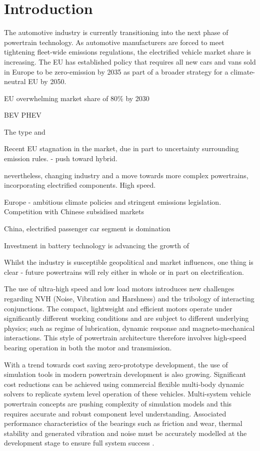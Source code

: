 \chapter{Introduction} \label{Introduction}

The automotive industry is currently transitioning into the next phase of powertrain technology. As automotive manufacturers are forced to meet tightening fleet-wide emissions regulations, the electrified vehicle market share is increasing. The EU has established policy \cite{EUL110/5} that requires all new cars and vans sold in Europe to be zero-emission by 2035 as part of a broader strategy for a climate-neutral EU by 2050.

EU overwhelming market share of 80\% by 2030 

BEV PHEV 

The type and 

Recent EU stagnation in the market, due in part to uncertainty surrounding emission rules. - push toward hybrid.

nevertheless, changing industry and a move towards more complex powertrains, incorporating electrified components. High speed. 

Europe - ambitious climate policies and stringent emissions legislation. Competition with Chinese subsidised markets

China, electrified passenger car segment is domination 

Investment in battery technology is advancing the growth of 

Whilst the industry is susceptible geopolitical and market influences, one thing is clear - future powertrains will rely either in whole or in part on electrification.


The use of ultra-high speed and low load motors introduces new challenges regarding NVH (Noise, Vibration and Harshness) and the tribology of interacting conjunctions. The compact, lightweight and efficient motors operate under significantly different working conditions and are subject to different underlying physics; such as regime of lubrication, dynamic response and magneto-mechanical interactions. This style of powertrain architecture therefore involves high-speed bearing operation in both the motor and transmission.

With a trend towards cost saving zero-prototype development, the use of simulation tools in modern powertrain development is also growing. Significant cost reductions can be achieved using commercial flexible multi-body dynamic solvers to replicate system level operation of these vehicles. Multi-system vehicle powertrain concepts are pushing complexity of simulation models and this requires accurate and robust component level understanding. Associated performance characteristics of the bearings such as friction and wear, thermal stability and generated vibration and noise must be accurately modelled at the development stage to ensure full system success \cite{Wensing1972a}. 

